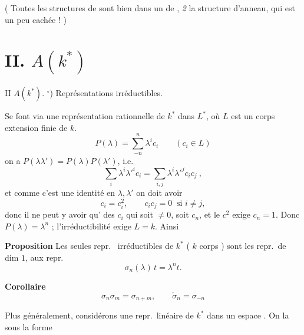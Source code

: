 \documentclass[11pt,a4paper]{article}
\begin{document}

( Toutes les structures de \ill{} sont bien \ill{} \ill{} dans un \ill{} de
, \emph{2} \ill{} la structure d'anneau, qui est un peu
cachée ! )

\section*{II. \quad $A(k^{*})$}



II \qquad $A(k^{*})$. \struck{\ill{}} \quad $^{\circ}$) Représentations
irréductibles.

Se font via une représentation rationnelle de $k^{*}$ dans $L^{*}$, où $L$ est
un corps extension finie de $k$.
\[ P(\lambda) = \sum_{-n}^{n} \lambda^{i} c_{i} \qquad ( c_{i} \in L ) \]
on a $P(\lambda\lambda') = P(\lambda) P(\lambda')$, i.e.
\[ \sum_{i} \lambda^{i} \lambda'^{i} c_{i}
 = \sum_{i,j} \lambda^{i} \lambda'^{j} c_{i} c_{j} \ , \]
et comme c'est une identité en $\lambda, \lambda'$ on doit avoir
\[ c_{i} = c_{i}^{2} , \qquad c_{i} c_{j} = 0 \ \text{ si } i \neq j , \]
donc il ne peut y avoir qu'\struck{\ill{}} \ill{} des $c_{i}$ qui soit
$\neq 0$, soit $c_{n}$, et le \ill{} $c^{2}$ \ill{} exige $c_{n} = 1$. Donc
$P(\lambda) = \lambda^{n}$ ; l'irréductibilité \ill{} exige $L = k$. Ainsi

\textbf{Proposition} Les seules repr.\  irréductibles de $k^{*}$
( $k$ corps  ) sont les repr.\ de dim $1$,
 \ill{} aux repr.\ \struck{\ill{}}
\[ \sigma_{n}(\lambda)\, t = \lambda^{n} t . \]

\textbf{Corollaire}
\[ \sigma_{n} \sigma_{m} = \sigma_{n+m} , \qquad
   \check{\sigma}_{n} = \sigma_{-n} \]

Plus généralement, considérons une repr.\ linéaire 
 de $k^{*}$ dans un espace \ill{}. On \ill{} la \ill{} \ill{}
sous la forme
\end{document}
